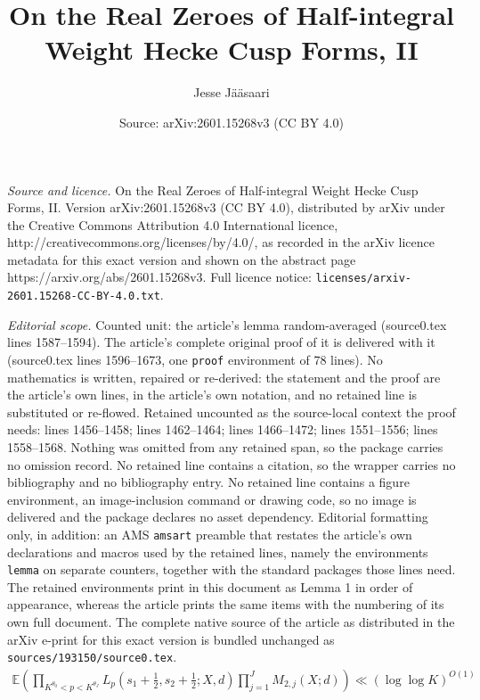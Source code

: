 \documentclass[10pt,a4paper]{amsart}
\title{On the Real Zeroes of Half-integral Weight Hecke Cusp Forms, II}
\author{Jesse J\"a\"asaari}
\date{Source: arXiv:2601.15268v3 (CC BY 4.0)}
\begin{document}
\maketitle

\noindent\emph{Source and licence.} On the Real Zeroes of Half-integral Weight Hecke Cusp Forms, II. Version arXiv:2601.15268v3 (CC BY 4.0), distributed by arXiv under the Creative Commons Attribution 4.0 International licence, http://creativecommons.org/licenses/by/4.0/, as recorded in the arXiv licence metadata for this exact version and shown on the abstract page https://arxiv.org/abs/2601.15268v3. Full licence notice: \texttt{licenses/arxiv-2601.15268-CC-BY-4.0.txt}.\par\smallskip

\noindent\textit{Editorial scope.} Counted unit: the article's lemma random-averaged (source0.tex lines 1587--1594). The article's complete original proof of it is delivered with it (source0.tex lines 1596--1673, one \texttt{proof} environment of 78 lines). No mathematics is written, repaired or re-derived: the statement and the proof are the article's own lines, in the article's own notation, and no retained line is substituted or re-flowed.  Retained uncounted as the source-local context the proof needs: lines 1456--1458; lines 1462--1464; lines 1466--1472; lines 1551--1556; lines 1558--1568.  Nothing was omitted from any retained span, so the package carries no omission record.  No retained line contains a citation, so the wrapper carries no bibliography and no bibliography entry.  No retained line contains a figure environment, an image-inclusion command or drawing code, so no image is delivered and the package declares no asset dependency.  Editorial formatting only, in addition: an AMS \texttt{amsart} preamble that restates the article's own declarations and macros used by the retained lines, namely the environments \texttt{lemma} on separate counters, together with the standard packages those lines need.  The retained environments print in this document as Lemma 1 in order of appearance, whereas the article prints the same items with the numbering of its own full document.  The complete native source of the article as distributed in the arXiv e-print for this exact version is bundled unchanged as \texttt{sources/193150/source0.tex}.
\begin{align}\label{loglog-bound}
\mathbb E\left(\prod_{K^{\theta_0}<p<K^{\theta_J}}L_p\left(s_1+\frac12,s_2+\frac12;X,d\right)\prod_{j=1}^J M_{2,j}(X;d)\right)\ll (\log\log K)^{O(1)}
\end{align}
\end{document}
